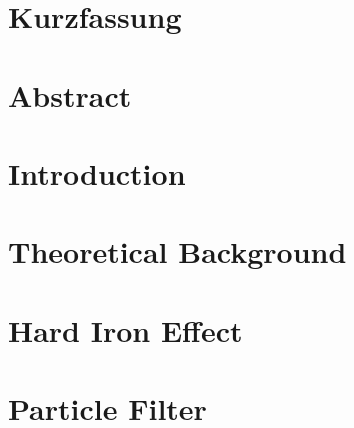\documentclass[12pt,a4paper,twoside,open=right,bibliography=totoc,BCOR=10mm]{scrreprt}
\begin{document}

\titelblattTUWienPhysik
{}

\titlePageTUWienPhysik

\chapter*{Kurzfassung}
\label{ch:kurzfassung}


\chapter*{Abstract}
\label{ch:abstract}


\tableofcontents
{}
\newpage
\cleardoublepage %
\setcounter{page}{1}

\chapter{Introduction}
\label{ch:introduction}


\chapter{Theoretical Background}
\label{ch:background}


\chapter{Hard Iron Effect}
\label{ch:problem}


\chapter{Particle Filter}
\label{ch:particle}

\end{document}
